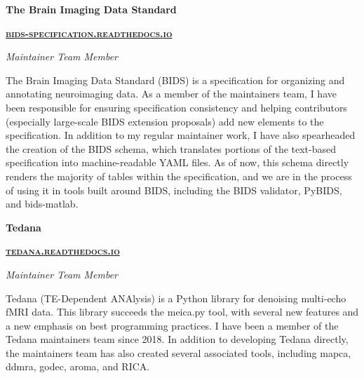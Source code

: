 \documentclass[10pt]{article}
\newcommand{\shorturl}[1]{\href{https://#1}{\textsc{#1}}}
\begin{document}
\begin{samepage}
\begin{minipage}[t]{.5\linewidth}
	\flushleft
	\noindent
	\textbf{The Brain Imaging Data Standard}
\end{minipage}
\hfill
\begin{minipage}[t]{.5\linewidth}
	\flushright
	\noindent
	\textbf{\shorturl{bids-specification.readthedocs.io}}
\end{minipage}
\nopagebreak
\emph{Maintainer Team Member}
\nopagebreak
\begin{adjustwidth}{2em}{0em}
	The Brain Imaging Data Standard (BIDS) is a specification for organizing and annotating neuroimaging data.
	As a member of the maintainers team, I have been responsible for ensuring specification consistency
	and helping contributors (especially large-scale BIDS extension proposals) add new elements to the specification.
	In addition to my regular maintainer work, I have also spearheaded the creation of the BIDS schema,
	which translates portions of the text-based specification into machine-readable YAML files.
	As of now, this schema directly renders the majority of tables within the specification,
	and we are in the process of using it in tools built around BIDS, including the BIDS validator, PyBIDS, and bids-matlab.
\end{adjustwidth}
\end{samepage}

\bigskip

\begin{samepage}
\begin{minipage}[t]{.5\linewidth}
	\flushleft
	\noindent
	\textbf{Tedana}
\end{minipage}
\hfill
\begin{minipage}[t]{.5\linewidth}
	\flushright
	\noindent
	\textbf{\shorturl{tedana.readthedocs.io}}
\end{minipage}
\nopagebreak
\emph{Maintainer Team Member}
\nopagebreak
\begin{adjustwidth}{2em}{0em}
	Tedana (TE-Dependent ANAlysis) is a Python library for denoising multi-echo fMRI data.
	This library succeeds the meica.py tool, with several new features and a new emphasis on best programming practices.
	I have been a member of the Tedana maintainers team since 2018.
	In addition to developing Tedana directly, the maintainers team has also created several associated tools,
	including mapca, ddmra, godec, aroma, and RICA.
\end{adjustwidth}
\end{samepage}
\end{document}

